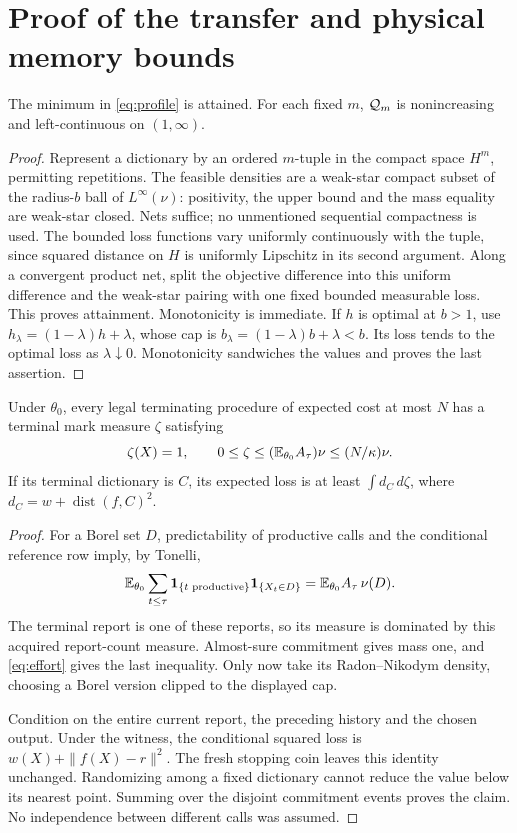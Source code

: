 \section{Proof of the transfer and physical memory bounds}
\begin{lemma}\label{lem:attain}
The minimum in \eqref{eq:profile} is attained. For each fixed $m$, $\mathcal Q_m$ is nonincreasing and left-continuous on $(1,\infty)$.
\end{lemma}
\begin{proof}
Represent a dictionary by an ordered $m$-tuple in the compact space $H^m$, permitting repetitions. The feasible densities are a weak-star compact subset of the radius-$b$ ball of $L^\infty(\nu)$: positivity, the upper bound and the mass equality are weak-star closed. Nets suffice; no unmentioned sequential compactness is used. The bounded loss functions vary uniformly continuously with the tuple, since squared distance on $H$ is uniformly Lipschitz in its second argument. Along a convergent product net, split the objective difference into this uniform difference and the weak-star pairing with one fixed bounded measurable loss. This proves attainment. Monotonicity is immediate. If $h$ is optimal at $b>1$, use $h_\lambda=(1-\lambda)h+\lambda$, whose cap is $b_\lambda=(1-\lambda)b+\lambda<b$. Its loss tends to the optimal loss as $\lambda\downarrow0$. Monotonicity sandwiches the values and proves the last assertion.
\end{proof}

\begin{lemma}\label{lem:lower}
Under $\theta_0$, every legal terminating procedure of expected cost at most $N$ has a terminal mark measure $\zeta$ satisfying
\begin{equation}\label{eq:dominated-terminal}
 \zeta(X)=1,\qquad
 0\le\zeta\le (\mathbb E_{\theta_0}A_\tau)\nu\le (N/\kappa)\nu.
\end{equation}
If its terminal dictionary is $C$, its expected loss is at least $\int d_C\,d\zeta$, where $d_C=w+\operatorname{dist}(f,C)^2$.
\end{lemma}
\begin{proof}
For a Borel set $D$, predictability of productive calls and the conditional reference row imply, by Tonelli,
\[
 \mathbb E_{\theta_0}\sum_{t\le\tau}\mathbf1_{\{t\text{ productive}\}}\mathbf1_{\{X_t\in D\}}
   =\mathbb E_{\theta_0}A_\tau\,\nu(D).
\]
The terminal report is one of these reports, so its measure is dominated by this acquired report-count measure. Almost-sure commitment gives mass one, and \eqref{eq:effort} gives the last inequality. Only now take its Radon--Nikodym density, choosing a Borel version clipped to the displayed cap.

Condition on the entire current report, the preceding history and the chosen output. Under the witness, the conditional squared loss is $w(X)+\|f(X)-r\|^2$. The fresh stopping coin leaves this identity unchanged. Randomizing among a fixed dictionary cannot reduce the value below its nearest point. Summing over the disjoint commitment events proves the claim. No independence between different calls was assumed.
\end{proof}

